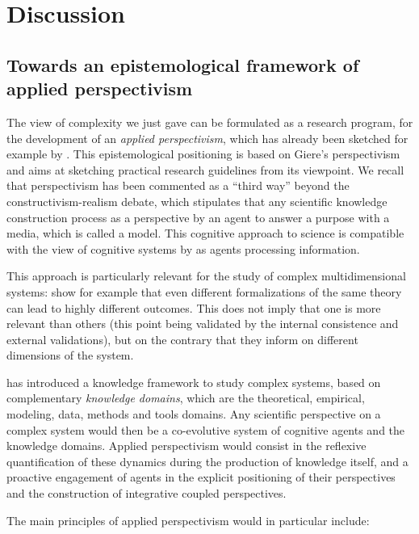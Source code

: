 \section{Discussion}


\subsection{Towards an epistemological framework of applied perspectivism}



The view of complexity we just gave can be formulated as a research program, for the development of an \emph{applied perspectivism}, which has already been sketched for example by \cite{2018arXiv180807282B}. This epistemological positioning is based on Giere's perspectivism \cite{giere2010scientific} and aims at sketching practical research guidelines from its viewpoint. We recall that perspectivism has been commented as a ``third way'' beyond the constructivism-realism debate, which stipulates that any scientific knowledge construction process as a perspective by an agent to answer a purpose with a media, which is called a model. This cognitive approach to science \cite{giere2010explaining} is compatible with the view of cognitive systems by \cite{gershenson2012world} as agents processing information.

This approach is particularly relevant for the study of complex multidimensional systems: \cite{muelder2018} show for example that even different formalizations of the same theory can lead to highly different outcomes. This does not imply that one is more relevant than others (this point being validated by the internal consistence and external validations), but on the contrary that they inform on different dimensions of the system.

\cite{raimbault2017applied} has introduced a knowledge framework to study complex systems, based on complementary \emph{knowledge domains}, which are the theoretical, empirical, modeling, data, methods and tools domains. Any scientific perspective on a complex system would then be a co-evolutive system of cognitive agents and the knowledge domains. Applied perspectivism would consist in the reflexive quantification of these dynamics during the production of knowledge itself, and a proactive engagement of agents in the explicit positioning of their perspectives and the construction of integrative coupled perspectives.

The main principles of applied perspectivism would in particular include:

